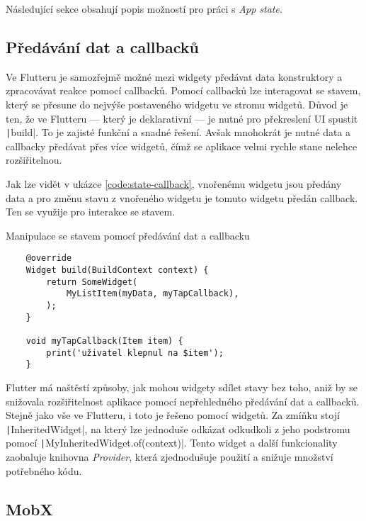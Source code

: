 Následující sekce obsahují popis možností pro práci s \emph{App state}.

\subsection{Předávání dat a callbacků}
\label{sec:data-callback-transfer}

Ve Flutteru je samozřejmě možné mezi widgety předávat data konstruktory
a zpracovávat reakce pomocí callbacků.
Pomocí callbacků lze interagovat se stavem,
který se přesune do nejvýše postaveného widgetu ve stromu widgetů.
Důvod je ten,
že ve Flutteru
--- který je deklarativní ---
je nutné pro překreslení UI spustit \texttt|build|.
To je zajisté funkční a snadné řešení.
Avšak mnohokrát je nutné data a callbacky předávat přes více widgetů,
čímž se aplikace velmi rychle stane nelehce rozšiřitelnou.
\cite{flutter_state_mgmt_simple}

Jak lze vidět v ukázce \ref{code:state-callback},
vnořenému widgetu jsou předány data
a pro změnu stavu z vnořeného widgetu je tomuto widgetu předán callback.
Ten se využije pro interakce se stavem.

\begin{listing}
    \caption{Manipulace se stavem pomocí předávání dat a callbacku
\cite{flutter_state_mgmt_simple}}
    \label{code:state-callback}
    \begin{verbatim}
    @override
    Widget build(BuildContext context) {
        return SomeWidget(
            MyListItem(myData, myTapCallback),
        );
    }

    void myTapCallback(Item item) {
        print('uživatel klepnul na $item');
    }
    \end{verbatim}
\end{listing}

Flutter má naštěstí způsoby,
jak mohou widgety sdílet stavy bez toho,
aniž by se snižovala rozšiřitelnost aplikace pomocí nepřehledného předávání
dat a callbacků.
Stejně jako vše ve Flutteru,
i toto je řešeno pomocí widgetů.
Za zmíňku stojí \texttt|InheritedWidget|,
na který lze jednoduše odkázat odkudkoli z jeho podstromu pomocí
\texttt|MyInheritedWidget.of(context)|.
Tento widget a další funkcionality zaobaluje knihovna \emph{Provider},
která zjednodušuje použití a snižuje množství potřebného kódu.

\subsection{MobX}

